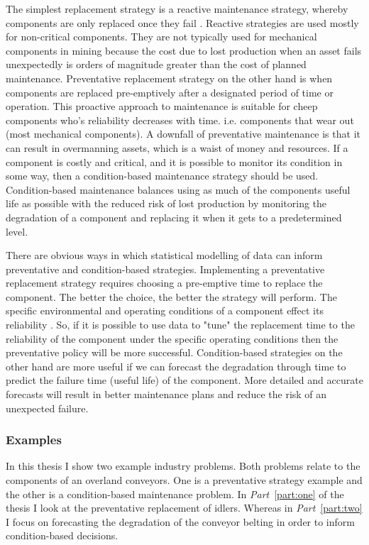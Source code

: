 The simplest replacement strategy is a reactive maintenance strategy, whereby components are only replaced once they fail \citep{heng2009}. Reactive strategies are used mostly for non-critical components. They are not typically used for mechanical components in mining because the cost due to lost production when an asset fails unexpectedly is orders of magnitude greater than the cost of planned maintenance. Preventative replacement strategy on the other hand is when components are replaced pre-emptively after a designated period of time or operation. This proactive approach to maintenance is suitable for cheep components who's reliability decreases with time. i.e. components that wear out (most mechanical components). A downfall of preventative maintenance is that it can result in overmanning assets, which is a waist of money and resources. If a component is costly and critical, and it is possible to monitor its condition in some way, then a condition-based maintenance strategy should be used. Condition-based maintenance balances using as much of the components useful life as possible with the reduced risk of lost production by monitoring the degradation of a component and replacing it when it gets to a predetermined level.

There are obvious ways in which statistical modelling of data can inform preventative and condition-based strategies. Implementing a preventative replacement strategy requires choosing a pre-emptive time to replace the component. The better the choice, the better the strategy will perform. The specific environmental and operating conditions of a component effect its reliability \citep{meeker2022}. So, if it is possible to use data to "tune" the replacement time to the reliability of the component under the specific operating conditions then the preventative policy will be more successful. Condition-based strategies on the other hand are more useful if we can forecast the degradation through time to predict the failure time (useful life) of the component. More detailed and accurate forecasts will result in better maintenance plans and reduce the risk of an unexpected failure.

\subsubsection*{Examples}

In this thesis I show two example industry problems. Both problems relate to the components of an overland conveyors. One is a preventative strategy example and the other is a condition-based maintenance problem. In \textit{Part}~\ref{part:one} of the thesis I look at the preventative replacement of idlers. Whereas in \textit{Part}~\ref{part:two} I focus on forecasting the degradation of the conveyor belting in order to inform condition-based decisions.

